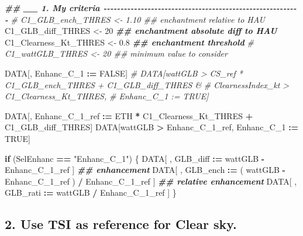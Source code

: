\documentclass[
  10pt,
  a4paper,oneside]{article}
\newenvironment{Shaded}{\begin{snugshade}}{\end{snugshade}}
\newcommand{\CommentTok}[1]{\textcolor[rgb]{0.56,0.35,0.01}{\textit{#1}}}
\newcommand{\ConstantTok}[1]{\textcolor[rgb]{0.56,0.35,0.01}{#1}}
\newcommand{\ControlFlowTok}[1]{\textcolor[rgb]{0.13,0.29,0.53}{\textbf{#1}}}
\newcommand{\DecValTok}[1]{\textcolor[rgb]{0.00,0.00,0.81}{#1}}
\newcommand{\DocumentationTok}[1]{\textcolor[rgb]{0.56,0.35,0.01}{\textbf{\textit{#1}}}}
\newcommand{\FloatTok}[1]{\textcolor[rgb]{0.00,0.00,0.81}{#1}}
\newcommand{\NormalTok}[1]{#1}
\newcommand{\OtherTok}[1]{\textcolor[rgb]{0.56,0.35,0.01}{#1}}
\newcommand{\SpecialCharTok}[1]{\textcolor[rgb]{0.81,0.36,0.00}{\textbf{#1}}}
\newcommand{\StringTok}[1]{\textcolor[rgb]{0.31,0.60,0.02}{#1}}
\begin{document}
\begin{Shaded}
\begin{Highlighting}[]
\DocumentationTok{\#\# \_\_ 1. My criteria  {-}{-}{-}{-}{-}{-}{-}{-}{-}{-}{-}{-}{-}{-}{-}{-}{-}{-}{-}{-}{-}{-}{-}{-}{-}{-}{-}{-}{-}{-}{-}{-}{-}{-}{-}{-}{-}{-}{-}{-}{-}{-}{-}{-}{-}{-}{-}{-}{-}{-}{-}{-}{-}{-}{-}{-}{-}{-}}
\CommentTok{\# C1\_GLB\_ench\_THRES     \textless{}{-}  1.10 \#\# enchantment relative to HAU}
\NormalTok{C1\_GLB\_diff\_THRES     }\OtherTok{\textless{}{-}} \DecValTok{20}    \DocumentationTok{\#\# enchantment absolute diff to HAU}
\NormalTok{C1\_Clearness\_Kt\_THRES }\OtherTok{\textless{}{-}}  \FloatTok{0.8}  \DocumentationTok{\#\# enchantment threshold}
\CommentTok{\# C1\_wattGLB\_THRES      \textless{}{-} 20    \#\# minimum value to consider}

\NormalTok{DATA[, Enhanc\_C\_1 }\SpecialCharTok{:=} \ConstantTok{FALSE}\NormalTok{]}
\CommentTok{\# DATA[wattGLB           \textgreater{} CS\_ref * C1\_GLB\_ench\_THRES + C1\_GLB\_diff\_THRES \&}
\CommentTok{\#      ClearnessIndex\_kt \textgreater{} C1\_Clearness\_Kt\_THRES,}
\CommentTok{\#      Enhanc\_C\_1 := TRUE]}

\NormalTok{DATA[, Enhanc\_C\_1\_ref }\SpecialCharTok{:=}\NormalTok{ ETH }\SpecialCharTok{*}\NormalTok{ C1\_Clearness\_Kt\_THRES }\SpecialCharTok{+}\NormalTok{ C1\_GLB\_diff\_THRES]}
\NormalTok{DATA[wattGLB }\SpecialCharTok{\textgreater{}}\NormalTok{ Enhanc\_C\_1\_ref,}
\NormalTok{     Enhanc\_C\_1 }\SpecialCharTok{:=} \ConstantTok{TRUE}\NormalTok{]}

\ControlFlowTok{if}\NormalTok{ (SelEnhanc }\SpecialCharTok{==} \StringTok{"Enhanc\_C\_1"}\NormalTok{) \{}
\NormalTok{    DATA[ , GLB\_diff }\SpecialCharTok{:=}\NormalTok{   wattGLB }\SpecialCharTok{{-}}\NormalTok{ Enhanc\_C\_1\_ref                    ] }\DocumentationTok{\#\# enhancement}
\NormalTok{    DATA[ , GLB\_ench }\SpecialCharTok{:=}\NormalTok{ ( wattGLB }\SpecialCharTok{{-}}\NormalTok{ Enhanc\_C\_1\_ref ) }\SpecialCharTok{/}\NormalTok{ Enhanc\_C\_1\_ref ] }\DocumentationTok{\#\# relative enhancement}
\NormalTok{    DATA[ , GLB\_rati }\SpecialCharTok{:=}\NormalTok{   wattGLB }\SpecialCharTok{/}\NormalTok{ Enhanc\_C\_1\_ref                    ]}
\NormalTok{\}}
\end{Highlighting}
\end{Shaded}

\hypertarget{use-tsi-as-reference-for-clear-sky.-1}{%
\subsection{2. Use TSI as reference for Clear sky.}\label{use-tsi-as-reference-for-clear-sky.-1}}
\end{document}
